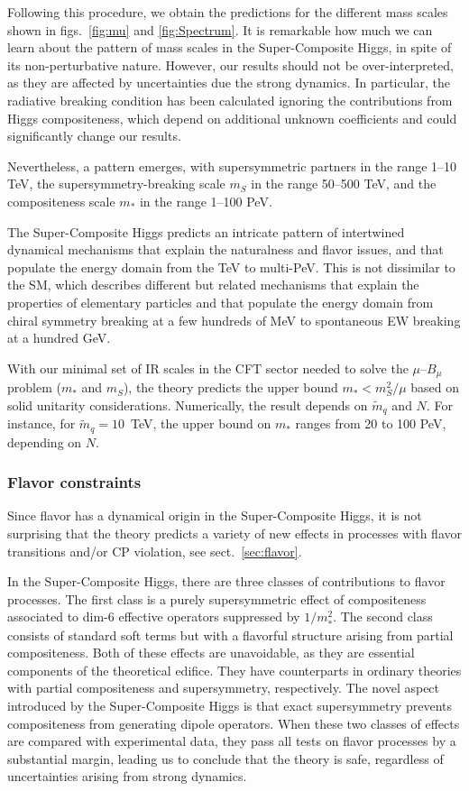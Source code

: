 \documentclass[a4paper,12pt]{article}
\def\sec#1{sect.~\ref{#1}}
\def\mst{m_*}
\def\mS{m_S}
\begin{document}
{{{{Following this procedure, we obtain the predictions for the different mass scales shown in figs.~\ref{fig:mu} and \ref{fig:Spectrum}. It is remarkable how much we can learn about the pattern of mass scales in the Super-Composite Higgs, in spite of its non-perturbative nature. However, our results should not be over-interpreted, as they are affected by uncertainties due the strong dynamics. In particular, the radiative breaking condition has been calculated ignoring the contributions from Higgs compositeness, which depend on additional unknown coefficients and could significantly change our results.

Nevertheless, a pattern emerges, with supersymmetric partners in the range 1--10 TeV, the supersymmetry-breaking scale $\mS$ in the range 50--500 TeV, and the compositeness scale $\mst$ in the range 1--100 PeV.

The Super-Composite Higgs predicts an intricate pattern of intertwined dynamical mechanisms that explain the naturalness and flavor issues, and that populate the energy domain from the TeV to multi-PeV. This is not dissimilar to the SM, which describes different but related mechanisms that explain the properties of elementary particles and that populate the energy domain from chiral symmetry breaking at a few hundreds of MeV to spontaneous EW breaking at a hundred GeV.

With our minimal set of IR scales in the CFT sector needed to solve the $\mu$--$B_{\mu}$ problem ($\mst$ and $\mS$), the theory predicts the upper bound $\mst < \mS^2/\mu$ based on solid unitarity considerations. Numerically, the result depends on ${\tilde m}_q$ and $N$. For instance, for ${\tilde m}_q = 10$~TeV, the upper bound on $\mst$ ranges from 20 to 100 PeV, depending on $N$.

\subsubsection*{Flavor constraints}

Since flavor has a dynamical origin in the Super-Composite Higgs, it is not surprising that the theory predicts a variety of new effects in processes with flavor transitions and/or CP violation, see \sec{sec:flavor}.

In the Super-Composite Higgs, there are three classes of contributions to flavor processes. The first class is a purely supersymmetric effect of compositeness associated to dim-6 effective operators suppressed by $1/\mst^2$. The second class consists of standard soft terms but with a flavorful structure arising from partial compositeness. Both of these effects are unavoidable, as they are essential components of the theoretical edifice. They have counterparts in ordinary theories with partial compositeness and supersymmetry, respectively. The novel aspect introduced by the Super-Composite Higgs is that exact supersymmetry prevents compositeness from generating dipole operators. When these two classes of effects are compared with experimental data, they pass all tests on flavor processes by a substantial margin, leading us to conclude that the theory is safe, regardless of uncertainties arising from strong dynamics.

}}}}
\end{document}
